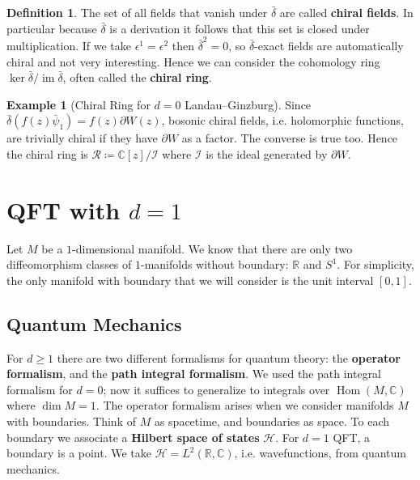 \documentclass{report}
\theoremstyle{plain}
\theoremstyle{definition}
\newtheorem{definition}[theorem]{Definition}
\newtheorem{example}[theorem]{Example}
\theoremstyle{remark}
\newcommand{\di}{\partial}
\newcommand{\bC}{\mathbb{C}}
\newcommand{\bR}{\mathbb{R}}
\newcommand{\cH}{\mathcal{H}}
\newcommand{\cI}{\mathcal{I}}
\newcommand{\cR}{\mathcal{R}}
\DeclareMathOperator{\Hom}{Hom}
\DeclareMathOperator{\im}{im}
\newcommand{\mc}{\mathcal}
\begin{document}
\begin{definition}
  The set of all fields that vanish under $\bar\delta$ are called
  \textbf{chiral fields}. In particular because $\bar\delta$ is a
  derivation it follows that this set is closed under multiplication.
  If we take $\epsilon^1=\epsilon^2$ then $\bar\delta^2 = 0$, so
  $\bar\delta$-exact fields are automatically chiral and not very
  interesting. Hence we can consider the cohomology ring
  $\ker\bar\delta/\im\bar\delta$, often called the
  \textbf{chiral ring}.
\end{definition}

\begin{example}[Chiral Ring for $d=0$ Landau--Ginzburg]
  Since $\bar\delta(f(z)\bar\psi_1) = f(z) \di W(z)$, bosonic chiral
  fields, i.e. holomorphic functions, are trivially chiral if they
  have $\di W$ as a factor. The converse is true too. Hence the chiral
  ring is $\cR \coloneqq \bC[z]/\cI$ where $\cI$ is the ideal
  generated by $\di W$.
\end{example}


\section{QFT with \texorpdfstring{$d=1$}{d=1}}

Let $M$ be a $1$-dimensional manifold. We know that there are only two
diffeomorphism classes of $1$-manifolds without boundary: $\bR$ and
$S^1$. For simplicity, the only manifold with boundary that we will
consider is the unit interval $[0,1]$.

\subsection{Quantum Mechanics}

For $d \ge 1$ there are two different formalisms for quantum theory:
the {\bf operator formalism}, and the {\bf path integral formalism}.
We used the path integral formalism for $d=0$; now it suffices to
generalize to integrals over $\Hom(M, \bC)$ where $\dim M = 1$. The
operator formalism arises when we consider manifolds $M$ with
boundaries. Think of $M$ as spacetime, and boundaries as space. To
each boundary we associate a {\bf Hilbert space of states} $\cH$. For
$d=1$ QFT, a boundary is a point. We take $\cH = L^2(\bR, \bC)$, i.e.
wavefunctions, from quantum mechanics.
\end{document}
